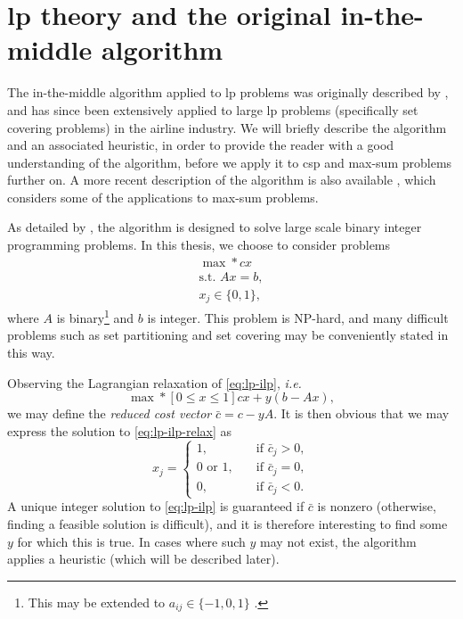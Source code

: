 \section[Linear programming theory]{lp theory and the original in-the-middle algorithm}
The in-the-middle algorithm applied to \gls{lp} problems was originally described by \textcite{Wedelin95}, and has since been extensively applied to large \acrlong{lp} problems (specifically set covering problems) in the airline industry.
We will briefly describe the algorithm and an associated heuristic, in order to provide the reader with a good understanding of the algorithm, before we apply it to \gls{csp} and max-sum problems further on. A more recent description of the algorithm is also available \parencite{Wedelin13}, which considers some of the applications to max-sum problems.

As detailed by \textcite{Wedelin95}, the algorithm is designed to solve large scale binary integer programming problems.
In this thesis, we choose to consider problems
\begin{equation}
	\label{eq:lp-ilp}
	\begin{gathered}
		\max* cx \\
		\text{s.t. } Ax = b, \\
		x_j \in \{0,1\},
	\end{gathered}
\end{equation}
where \(A\) is binary\footnote{This may be extended to \(a_{ij}\in\{-1,0,1\}\) \parencite{Wedelin13}.} and \(b\) is integer.
This problem is NP-hard, and many difficult problems such as set partitioning and set covering may be conveniently stated in this way.

Observing the Lagrangian relaxation of \eqref{eq:lp-ilp}, \emph{i.e.}
\begin{equation}
	\label{eq:lp-ilp-relax}
	\max*[0\leq x\leq1] cx + y(b-Ax),
\end{equation}
we may define the \emph{reduced cost vector} \(\bar{c}=c-yA\).
It is then obvious that we may express the solution to \eqref{eq:lp-ilp-relax} as
\begin{equation*}
	x_j = 
	\begin{cases}
		1, &\quad \text{if \(\bar{c}_j > 0\)}, \\
		0\text{ or }1, &\quad \text{if \(\bar{c}_j = 0\)}, \\
		0, &\quad \text{if \(\bar{c}_j < 0\)}.
	\end{cases}
\end{equation*}
A unique integer solution to \eqref{eq:lp-ilp} is guaranteed if \(\bar{c}\) is nonzero (otherwise, finding a feasible solution is difficult), and it is therefore interesting to find some \(y\) for which this is true.
In cases where such \(y\) may not exist, the algorithm applies a heuristic (which will be described later).

